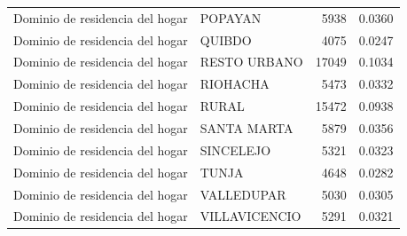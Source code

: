 \begin{table}
\begin{tabular}[t]{llrr}
Dominio de residencia del hogar & POPAYAN & 5938 & 0.0360\\
Dominio de residencia del hogar & QUIBDO & 4075 & 0.0247\\
Dominio de residencia del hogar & RESTO URBANO & 17049 & 0.1034\\
\addlinespace
Dominio de residencia del hogar & RIOHACHA & 5473 & 0.0332\\
Dominio de residencia del hogar & RURAL & 15472 & 0.0938\\
Dominio de residencia del hogar & SANTA MARTA & 5879 & 0.0356\\
Dominio de residencia del hogar & SINCELEJO & 5321 & 0.0323\\
Dominio de residencia del hogar & TUNJA & 4648 & 0.0282\\
\addlinespace
Dominio de residencia del hogar & VALLEDUPAR & 5030 & 0.0305\\
Dominio de residencia del hogar & VILLAVICENCIO & 5291 & 0.0321\\
\bottomrule
\end{tabular}
\end{table}
